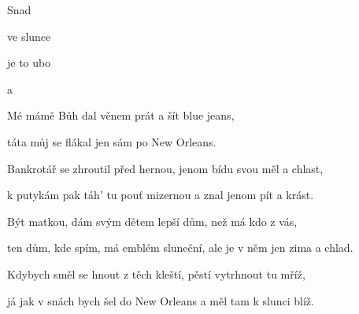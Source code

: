 

\zs
Snad    

ve   slunce 

je to    ubo

a    
\ks

\zs
Mé mámě Bůh dal věnem prát a šít blue jeans,

táta můj se flákal jen sám po New Orleans.
\ks

\zs
Bankrotář se zhroutil před hernou, jenom bídu svou měl a chlast,

k putykám pak táh' tu pouť mizernou a znal jenom pít a krást.
\ks

\zs
Být matkou, dám svým dětem lepší dům, než má kdo z vás,

ten dům, kde spím, má emblém sluneční, ale je v něm jen zima a chlad.
\ks

\zs
Kdybych směl se hnout z těch kleští, pěstí vytrhnout tu mříž,

já jak v snách bych šel do New Orleans a měl tam k slunci blíž.
\ks

\kp
